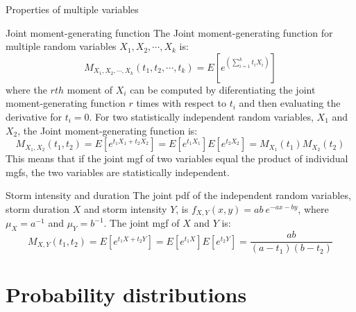 \documentclass[8pt]{beamer}
\renewcommand{\emph}[1]{\textcolor{myorange}{#1}}
\begin{document}
\begin{frame}{Properties of multiple variables}
    \begin{block}{Joint moment-generating function}
        The \alert{Joint moment-generating function} for multiple random variables $X_1, X_2, \cdots, X_k$ is:
        \[
            M_{X_1, X_2, \cdots, X_k} (t_1, t_2, \cdots, t_k) = E\left[ e^{\left( \sum_{i=1}^k t_i X_i \right)}\right] 
    \]
    where the $rth$ moment of $X_i$ can be computed by diferentiating the joint moment-generating function $r$ times with respect to $t_i$ and then evaluating the derivative for $t_i = 0$. 
    For two statistically independent random variables, $X_1$ and $X_2$, the \emph{Joint moment-generating function} is:
    \[
        M_{X_1, X_2} (t_1, t_2) = E[e^{t_1 X_1 + t_2 X_2}] = E[e^{t_1 X_1}] E[ e^{t_2 X_2} ] = M_{X_1} (t_1) M_{X_2} (t_2)
    \]
    This means that if the joint \emph{mgf} of two variables equal the product of individual \emph{mgf}s, the two variables are statistically independent. 
        \end{block}

    \begin{exampleblock}{Storm intensity and duration}
        The joint \emph{pdf} of the independent random variables, storm duration $X$ and storm intensity $Y$, is $f_{X,Y} (x,y) = ab \ e^{-ax-by}$, where $\mu_X = a^{-1}$ and $\mu_Y = b^{-1}$. The joint \emph{mgf} of $X$ and $Y$ is:
        \[
            M_{X,Y} (t_1, t_2) = E \left[ e^{t_1 X + t_2 Y} \right] = E \left[ e^{t_1 X} \right] E \left[ e^{t_2 Y} \right] = \frac{ab}{(a-t_1) (b-t_2)}
        \]

    \end{exampleblock}
\end{frame}


\section{Probability distributions} %
\end{document}
